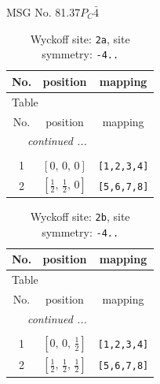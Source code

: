 \documentclass[fleqn,8pt]{jsarticle}
\begin{document}
\setcounter{MaxMatrixCols}{32}

\renewcommand{\tablename}{Table~}
\renewcommand{\figurename}{Figure~}
\begin{center}
\LARGE
MSG No. 81.37\quad$P_{C}\bar{4}$
\end{center}
\renewcommand{\arraystretch}{1.2}
\begin{longtable}{ccc}
\caption{Wyckoff site: {\tt 2a}, site symmetry: {\tt -4..}}
 \\
 \hline \hline
No. & position & mapping \\ \hline \endfirsthead

\multicolumn{2}{l}{\tablename\ \thetable{}} \\
 \hline \hline
No. & position & mapping \\ \hline \endhead

 \hline \hline
\multicolumn{2}{r}{\footnotesize\it continued ...} \\ \endfoot

 \hline \hline
\multicolumn{2}{r}{} \\ \endlastfoot

1 & $\left[ 0,\, 0,\, 0 \right]$ & {\tt [1,2,3,4]} \\ \hline
2 & $\left[ \frac{1}{2},\, \frac{1}{2},\, 0 \right]$ & {\tt [5,6,7,8]} \\
\end{longtable}
\renewcommand{\arraystretch}{1.2}
\begin{longtable}{ccc}
\caption{Wyckoff site: {\tt 2b}, site symmetry: {\tt -4..}}
 \\
 \hline \hline
No. & position & mapping \\ \hline \endfirsthead

\multicolumn{2}{l}{\tablename\ \thetable{}} \\
 \hline \hline
No. & position & mapping \\ \hline \endhead

 \hline \hline
\multicolumn{2}{r}{\footnotesize\it continued ...} \\ \endfoot

 \hline \hline
\multicolumn{2}{r}{} \\ \endlastfoot

1 & $\left[ 0,\, 0,\, \frac{1}{2} \right]$ & {\tt [1,2,3,4]} \\ \hline
2 & $\left[ \frac{1}{2},\, \frac{1}{2},\, \frac{1}{2} \right]$ & {\tt [5,6,7,8]} \\
\end{longtable}
\end{document}
